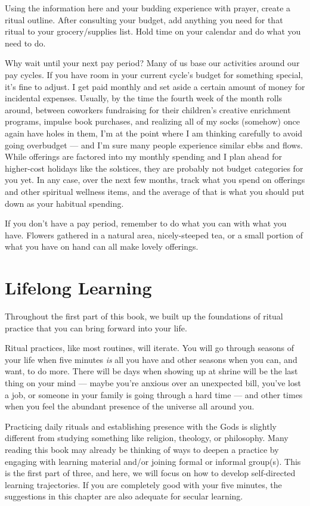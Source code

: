 \documentclass[
]{book}
\begin{document}
Using the information here and your budding experience with prayer, create a ritual outline. After consulting your budget, add anything you need for that ritual to your grocery/supplies list. Hold time on your calendar and do what you need to do.

Why wait until your next pay period? Many of us base our activities around our pay cycles. If you have room in your current cycle's budget for something special, it's fine to adjust. I get paid monthly and set aside a certain amount of money for incidental expenses. Usually, by the time the fourth week of the month rolls around, between coworkers fundraising for their children's creative enrichment programs, impulse book purchases, and realizing all of my socks (somehow) once again have holes in them, I'm at the point where I am thinking carefully to avoid going overbudget --- and I'm sure many people experience similar ebbs and flows. While offerings are factored into my monthly spending and I plan ahead for higher-cost holidays like the solstices, they are probably not budget categories for you yet. In any case, over the next few months, track what you spend on offerings and other spiritual wellness items, and the average of that is what you should put down as your habitual spending.

If you don't have a pay period, remember to do what you can with what you have. Flowers gathered in a natural area, nicely-steeped tea, or a small portion of what you have on hand can all make lovely offerings.

\hypertarget{lifelong-learning}{%
\chapter{Lifelong Learning}\label{lifelong-learning}}

Throughout the first part of this book, we built up the foundations of ritual practice that you can bring forward into your life.

Ritual practices, like most routines, will iterate. You will go through seasons of your life when five minutes \emph{is} all you have and other seasons when you can, and want, to do more. There will be days when showing up at shrine will be the last thing on your mind --- maybe you're anxious over an unexpected bill, you've lost a job, or someone in your family is going through a hard time --- and other times when you feel the abundant presence of the universe all around you.

Practicing daily rituals and establishing presence with the Gods is slightly different from studying something like religion, theology, or philosophy. Many reading this book may already be thinking of ways to deepen a practice by engaging with learning material and/or joining formal or informal group(s). This is the first part of three, and here, we will focus on how to develop self-directed learning trajectories. If you are completely good with your five minutes, the suggestions in this chapter are also adequate for secular learning.
\end{document}

